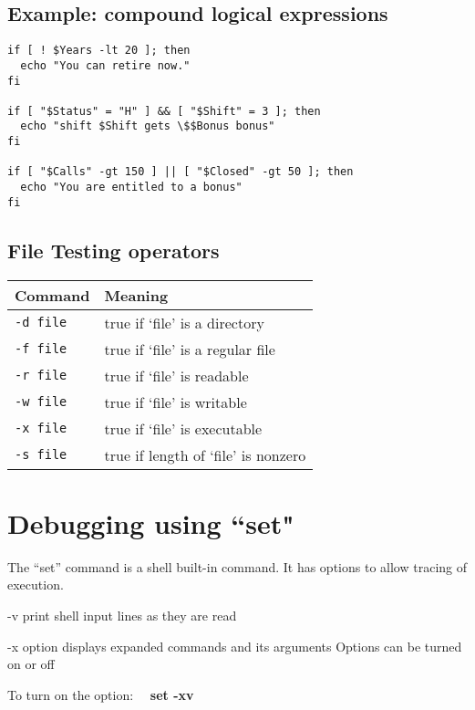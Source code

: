 \documentclass{report}
\begin{document}
\subsection{Example: compound logical expressions}
\begin{verbatim}
if [ ! $Years -lt 20 ]; then
  echo "You can retire now."
fi

if [ "$Status" = "H" ] && [ "$Shift" = 3 ]; then
  echo "shift $Shift gets \$$Bonus bonus"
fi

if [ "$Calls" -gt 150 ] || [ "$Closed" -gt 50 ]; then
  echo "You are entitled to a bonus"
fi
\end{verbatim}
\subsection{File Testing operators}
 \begin{table}[ht]
\centering
\begin{tabular}{@{}ll@{}}
\toprule
\textbf{Command} & \textbf{Meaning} \\
\midrule
\texttt{-d file} & true if `file' is a directory \\
\texttt{-f file} & true if `file' is a regular file \\
\texttt{-r file} & true if `file' is readable \\
\texttt{-w file} & true if `file' is writable \\
\texttt{-x file} & true if `file' is executable \\
\texttt{-s file} & true if length of `file' is nonzero \\
\bottomrule
\end{tabular}
\end{table}
\newpage
\section{Debugging using ``set"}
The ``set'' command is a shell built-in command. It has options to allow tracing of execution.
\vspace{1.5mm}

-v print shell input lines as they are read \vspace{1.5mm}

-x option displays expanded commands and its arguments
\bigbreak \noindent
Options can be turned on or off \vspace{1.5mm}

To turn on the option: \ \ \textbf{set -xv} \vspace{1.5mm}
\end{document}

